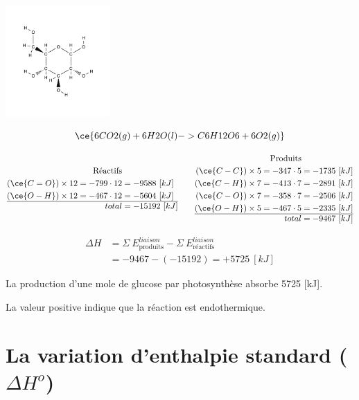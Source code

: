 \documentclass[
  11pt,
  a4paper,
  openany]{book}
\begin{document}
\begin{Answer}
\includegraphics[width=0.3\textwidth,height=\textheight]{images/glucose.png}

\[
\ce{6 CO2(g) + 6 H2O(l) -> C6H12O6 + 6 O2(g)}
\]

\[
\begin{split}
  \text{Réactifs}& \\
  (\ce{C=O}) \times 12 = -799 \cdot 12 &= -9588\ [kJ] \\
  (\ce{O-H}) \times 12 = -467 \cdot 12 &= -5604\ [kJ] \\
  \hline
  total &= -15192\ [kJ]
\end{split}
\qquad
\begin{split}
  \text{Produits}& \\
  (\ce{C-C}) \times 5 = -347 \cdot 5 &= -1735\ [kJ] \\
  (\ce{C-H}) \times 7 = -413 \cdot 7 &= -2891\ [kJ] \\
  (\ce{C-O}) \times 7 = -358 \cdot 7 &= -2506\ [kJ] \\
  (\ce{O-H}) \times 5 = -467 \cdot 5 &= -2335\ [kJ] \\
  \hline
  total &= -9467\ [kJ]
\end{split}
\]

\[
\begin{split}
\Delta H &= \Sigma\ E^{liaison}_{\text{produits}} - \Sigma\ E^{liaison}_{\text{réactifs}} \\
  &= -9467 - (-15192) = +5725\ [kJ]
\end{split}
\]

La production d'une mole de glucose par photosynthèse absorbe 5725 {[}kJ{]}.

La valeur positive indique que la réaction est endothermique.

\end{Answer}

\clearpage

\hypertarget{la-variation-denthalpie-standard-delta-ho}{%
\section{\texorpdfstring{La variation d'enthalpie standard (\(\Delta H^o\))}{La variation d'enthalpie standard (\textbackslash Delta H\^{}o)}}\label{la-variation-denthalpie-standard-delta-ho}}
\end{document}
